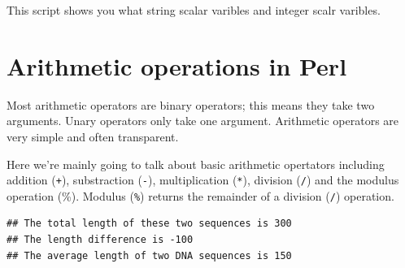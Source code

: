 \documentclass[]{book}
\makeatletter
\newenvironment{Shaded}{\begin{snugshade}}{\end{snugshade}}
\newcommand{\CharTok}[1]{\textcolor[rgb]{0.31,0.60,0.02}{#1}}
\newcommand{\CommentTok}[1]{\textcolor[rgb]{0.56,0.35,0.01}{\textit{#1}}}
\newcommand{\DataTypeTok}[1]{\textcolor[rgb]{0.13,0.29,0.53}{#1}}
\newcommand{\DecValTok}[1]{\textcolor[rgb]{0.00,0.00,0.81}{#1}}
\newcommand{\FunctionTok}[1]{\textcolor[rgb]{0.00,0.00,0.00}{#1}}
\newcommand{\KeywordTok}[1]{\textcolor[rgb]{0.13,0.29,0.53}{\textbf{#1}}}
\newcommand{\NormalTok}[1]{#1}
\newcommand{\StringTok}[1]{\textcolor[rgb]{0.31,0.60,0.02}{#1}}
\newenvironment{kframe}{%
\medskip{}
\setlength{\fboxsep}{.8em}
 \def\at@end@of@kframe{}%
 \ifinner\ifhmode%
  \def\at@end@of@kframe{\end{minipage}}%
  \begin{minipage}{\columnwidth}%
 \fi\fi%
 \def\FrameCommand##1{\hskip\@totalleftmargin \hskip-\fboxsep
 \colorbox{shadecolor}{##1}\hskip-\fboxsep
     \hskip-\linewidth \hskip-\@totalleftmargin \hskip\columnwidth}%
 \MakeFramed {\advance\hsize-\width
   \@totalleftmargin\z@ \linewidth\hsize
   \@setminipage}}%
 {\par\unskip\endMakeFramed%
 \at@end@of@kframe}
\renewenvironment{Shaded}{\begin{kframe}}{\end{kframe}}
\makeatother
\begin{document}
This script shows you what string scalar varibles and integer scalr varibles.

\hypertarget{arithmetic-operations-in-perl}{%
\section{Arithmetic operations in Perl}\label{arithmetic-operations-in-perl}}

Most arithmetic operators are binary operators; this means they take two arguments. Unary operators only take one argument. Arithmetic operators are very simple and often transparent.

Here we're mainly going to talk about basic arithmetic opertators including addition (\texttt{+}), substraction (\texttt{-}), multiplication (\texttt{*}), division (\texttt{/}) and the modulus operation (\%). Modulus (\texttt{\%}) returns the remainder of a division (\texttt{/}) operation.

\begin{Shaded}
\end{Shaded}

\begin{verbatim}
## The total length of these two sequences is 300 
## The length difference is -100
## The average length of two DNA sequences is 150
\end{verbatim}
\end{document}
